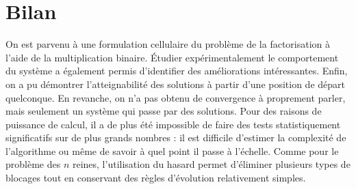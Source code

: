 

\section*{Bilan}


On est parvenu à une formulation cellulaire du problème de la factorisation à l'aide de la multiplication binaire. Étudier expérimentalement le comportement du système a également permis d'identifier des améliorations intéressantes. Enfin, on a pu démontrer l'atteignabilité des solutions à partir d'une position de départ quelconque. En revanche, on n'a pas obtenu de convergence à proprement parler, mais seulement un système qui passe par des solutions. Pour des raisons de puissance de calcul, il a de plus été impossible de faire des tests statistiquement significatifs sur de plus grands nombres : il est difficile d'estimer la complexité de l'algorithme ou même de savoir à quel point il passe à l'échelle. Comme pour le problème des $n$ reines, l'utilisation du hasard permet d'éliminer plusieurs types de blocages tout en conservant des règles d'évolution relativement simples.



